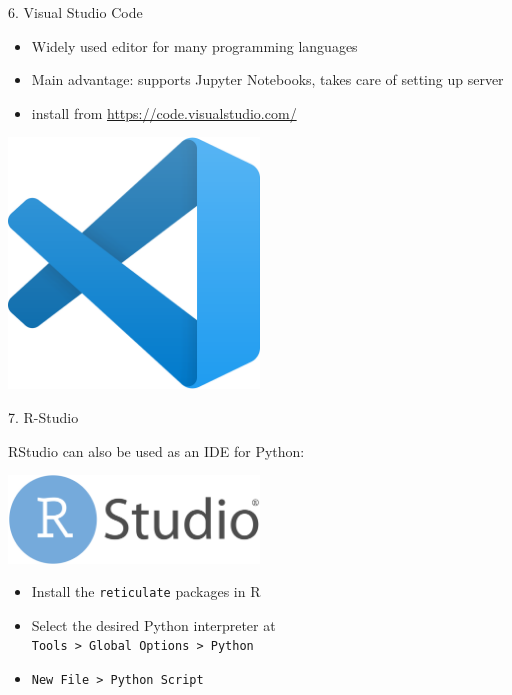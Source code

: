 \begin{vbframe}{6. Visual Studio Code}

	\vfill
	
	\begin{itemize}
		\item Widely used editor for many programming languages
		\item Main advantage: supports Jupyter Notebooks, takes care of setting up server
		\item install from \url{https://code.visualstudio.com/}
	\end{itemize}
	  
	
	\centering
	\includegraphics[width=0.5\textwidth]{figure/vscode.png}
	
	\vfill
	
	\end{vbframe}


\begin{vbframe}{7. R-Studio}

\vfill

RStudio can also be used as an IDE for Python:  

\centering
\includegraphics[width=0.5\textwidth]{figure/rstudio.png}

\begin{itemize}
	\item Install the \texttt{reticulate} packages in R
	\item Select the desired Python interpreter at\\
  \texttt{Tools > Global Options > Python}
	\item \texttt{New File > Python Script}
\end{itemize}

\vfill

\end{vbframe}

